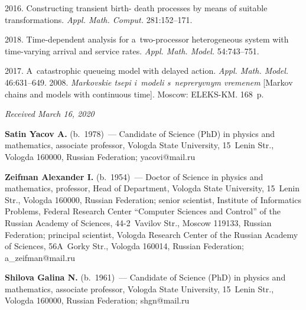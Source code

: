 \begin{multicols}{2}
{{\begin{thebibliography}{99}
 2016. Constructing transient birth-
death processes by means of suitable transformations. \textit{Appl. 
Math. Comput.} 281:152--171.

 2018. Time-dependent analysis for a~two-processor 
heterogeneous system with time-varying arrival and service rates. \textit{Appl.
Math. Model.} 54:743--751.

 2017. A~catastrophic queueing model with delayed action. 
\textit{Appl. Math. Model.} 46:631--649.
 2008. \textit{Markovskie tsepi 
i~modeli s~nepreryvnym vremenem} [Markov chains and models with continuous time]. 
Moscow: ELEKS-KM. 168~p.
\end{thebibliography}

 }
 }

\end{multicols}

\vspace*{-6pt}

\hfill{\small\textit{Received March 16, 2020}}




\Contr

\noindent
\textbf{Satin Yacov A.} (b.\ 1978)~--- Candidate of Science (PhD) in physics and 
mathematics, associate professor, Vologda State University, 15~Lenin Str., Vologda 160000, 
Russian Federation; \mbox{yacovi@mail.ru}

\vspace*{3pt}

\noindent
\textbf{Zeifman Alexander I.} (b.\ 1954)~--- Doctor of Science in physics and mathematics, 
professor, Head of Department, Vologda State University, 15~Lenin Str., Vologda 160000, 
Russian Federation; senior scientist, Institute of Informatics Problems, Federal Research Center 
``Computer Sciences and Control'' of the Russian Academy of Sciences, 44-2~Vavilov Str., 
Moscow 119133, Russian Federation; principal scientist, Vologda Research Center of the 
Russian Academy of Sciences, 56A~Gorky Str., Vologda 160014, Russian Federation; 
\mbox{a\_zeifman@mail.ru}

\vspace*{3pt}

\noindent
\textbf{Shilova Galina N.} (b.\ 1961)~--- Candidate of Science (PhD) in physics and 
mathematics, associate professor, Vologda State University, 15~Lenin Str., Vologda 160000, 
Russian Federation; \mbox{shgn@mail.ru}
\label{end\stat}

\renewcommand{\bibname}{\protect\rm Литература} 